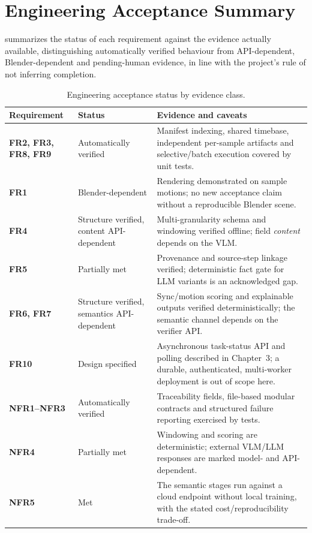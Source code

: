 \documentclass[11pt,oneside]{report}
\begin{document}
\section{Engineering Acceptance Summary}
 summarizes the status of each requirement against the
evidence actually available, distinguishing automatically verified behaviour from
API-dependent, Blender-dependent and pending-human evidence, in line with the
project's rule of not inferring completion.

\begin{table}[htbp]
\centering
\caption{Engineering acceptance status by evidence class.}
\label{tab:acceptance}
\begin{tabularx}{\textwidth}{>{\bfseries}l l X}
\toprule
Requirement & Status & Evidence and caveats \\
\midrule
FR2, FR3, FR8, FR9 & Automatically verified & Manifest indexing, shared timebase, independent per-sample artifacts and selective/batch execution covered by unit tests. \\
FR1 & Blender-dependent & Rendering demonstrated on sample motions; no new acceptance claim without a reproducible Blender scene. \\
FR4 & Structure verified, content API-dependent & Multi-granularity schema and windowing verified offline; field \emph{content} depends on the VLM. \\
FR5 & Partially met & Provenance and source-step linkage verified; deterministic fact gate for LLM variants is an acknowledged gap. \\
FR6, FR7 & Structure verified, semantics API-dependent & Sync/motion scoring and explainable outputs verified deterministically; the semantic channel depends on the verifier API. \\
FR10 & Design specified & Asynchronous task-status API and polling described in Chapter~3; a durable, authenticated, multi-worker deployment is out of scope here. \\
NFR1--NFR3 & Automatically verified & Traceability fields, file-based modular contracts and structured failure reporting exercised by tests. \\
NFR4 & Partially met & Windowing and scoring are deterministic; external VLM/LLM responses are marked model- and API-dependent. \\
NFR5 & Met & The semantic stages run against a cloud endpoint without local training, with the stated cost/reproducibility trade-off. \\
\bottomrule
\end{tabularx}
\end{table}
\end{document}
